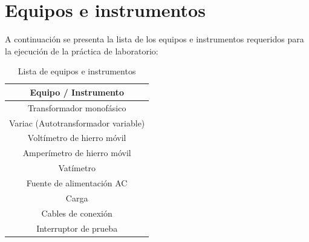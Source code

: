 \section{Equipos e instrumentos}
A continuación se presenta la lista de los equipos e instrumentos requeridos para la ejecución de la práctica de laboratorio:

\begin{table}[htbp]
    \centering
    \caption{Lista de equipos e instrumentos}
    \begin{tabular}{c}
        \toprule
        \textbf{Equipo / Instrumento} \\
        \midrule
        Transformador monofásico \\
        Variac (Autotransformador variable) \\
        Voltímetro de hierro móvil \\
        Amperímetro de hierro móvil \\
        Vatímetro \\
        Fuente de alimentación AC \\
        Carga \\
        Cables de conexión \\
        Interruptor de prueba \\
        \bottomrule
    \end{tabular}
    \label{tab:equipos_instrumentos}
\end{table}